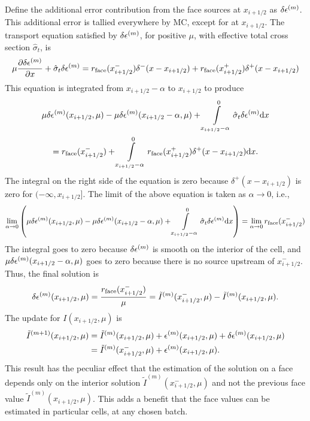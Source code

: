 Define the additional error contribution 
from the face sources at $x_{i+1/2}$ as $\delta\epsilon^{(m)}$.  This additional error is tallied
everywhere by MC, except for at $x_{i+1/2}$.  The transport equation satisfied by $\delta\epsilon^{(m)}$, for positive
$\mu$, with effective total cross 
section $\hat \sigma_t$, is
\begin{equation}
    \label{eq:ho_face}
    \mu \frac{\partial \delta\epsilon^{(m)}}{\partial x} + \hat\sigma_t \delta\epsilon^{(m)} = r_{\text{face}}(x_{i+1/2}^-)\delta^-(x - x_{i+1/2}) + r_{\text{face}}(x_{i+1/2}^+)\delta^+(x - x_{i+1/2}) 
\end{equation}
This equation is integrated from $x_{i+1/2}-\alpha$ to $x_{i+1/2}$ to produce
\begin{multline}
    \mu\delta\epsilon^{(m)}(x_{i+1/2},\mu) - \mu\delta\epsilon^{(m)}(x_{i+1/2}-\alpha,\mu)  + \int\limits_{x_{i+1/2}-\alpha}^0 
    \hat \sigma_t \delta\epsilon^{(m)} \mathrm{d} x  \\ =  r_{\text{face}}(x_{i+1/2}^-) +
        \int\limits_{x_{i+1/2}-\alpha}^0r_{\text{face}}(x_{i+1/2}^+)\delta^+(x - x_{i+1/2}) \mathrm{d} x.
\end{multline}
The integral on the right side of the equation is zero because $\delta^+(x-x_{i+1/2})$ is
zero for $(-\infty,x_{i+1/2}]$.  The limit of the above equation is taken as $\alpha\to0$, i.e.,
\begin{multline}
    \lim_{\alpha\to0}\left( \mu\delta\epsilon^{(m)}(x_{i+1/2},\mu) - \mu\delta\epsilon^{(m)}(x_{i+1/2}-\alpha,\mu)  + \int\limits_{x_{i+1/2}-\alpha}^0 
    \hat \sigma_t \delta\epsilon^{(m)} \mathrm{d} x \right)  = \lim_{\alpha\to0} r_{\text{face}}(x_{i+1/2}^-) 
\end{multline}
The integral goes to zero because $\delta\epsilon^{(m)}$ is smooth on the interior of the cell, and
$\mu\delta\epsilon^{(m)}(x_{i+1/2}-\alpha,\mu)$ goes to zero because there is no source upstream of
$x_{i+1/2}^-$. Thus, the final solution is
\begin{equation}
    \delta\epsilon^{(m)}(x_{i+1/2},\mu) = \frac{r_{\text{face}}(x_{i+1/2}^-)}{\mu} = 
     \tilde I^{(m)}(x_{i+1/2}^-,\mu) - \tilde I^{(m)}(x_{i+1/2},\mu)
.
\end{equation}
The update for $I(x_{i+1/2},\mu)$ is 
\begin{align}
   \tilde I^{(m+1)}(x_{i+1/2},\mu) &= \tilde I^{(m)}(x_{i+1/2},\mu) + \epsilon^{(m)}(x_{i+1/2},\mu) +
    \delta\epsilon^{(m)}(x_{i+1/2},\mu) \\ 
        &= \tilde I^{(m)}(x_{i+1/2}^-,\mu) + \epsilon^{(m)}(x_{i+1/2},\mu).
\end{align}
This result has the peculiar effect that the estimation of the solution on a face depends only on
the interior solution $\tilde I^{(m)}(x_{i+1/2}^-,\mu)$ and not the previous face value 
$\tilde I^{(m)}(x_{i+1/2},\mu)$. This adds a benefit that the face values can be estimated in particular cells, at any chosen batch.


